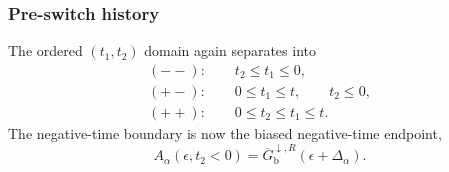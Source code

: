 \documentclass[
 reprint,
 superscriptaddress,
 amsmath,amssymb,
 aps,prb,
 longbibliography,
 floatfix
]{revtex4-2}
\begin{document}
\subsubsection{Pre-switch history}

The ordered $(t_1,t_2)$ domain again separates into
\begin{equation*}
\begin{gathered}
(--):\qquad t_2\le t_1\le0,
\\
(+-):\qquad 0\le t_1\le t,\qquad t_2\le0,
\\
(++):\qquad 0\le t_2\le t_1\le t.
\end{gathered}
\end{equation*}
The negative-time boundary is now the biased negative-time endpoint,
\begin{equation*}
A_\alpha(\epsilon,t_2<0)
=
\overline G_{\mathrm b}^{\downarrow,R}
(\epsilon+\Delta_\alpha).
\end{equation*}
\end{document}
